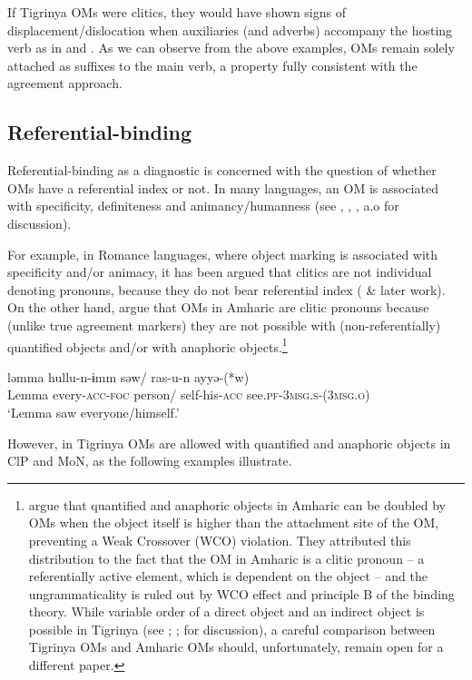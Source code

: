 \documentclass[output=paper]{langscibook}
\begin{document}
\noindent If Tigrinya OMs were clitics, they would have shown signs of displacement\slash dislocation when auxiliaries (and adverbs) accompany the hosting verb as in  and . As we can observe from the above examples, OMs remain solely attached as suffixes to the main verb, a property fully consistent with the agreement approach.


\subsection{Referential-binding}

Referential-binding as a diagnostic is concerned with the question of whether OMs have a referential index or not. In many languages, an OM is associated with specificity, definiteness and animancy/humanness (see \citealt{aissen03}, \citealt{danon2006}, \citealt{kalin16}, a.o for discussion). 

For example, in Romance languages, where object marking is associated with specificity and/or animacy, it has been argued that clitics are not individual denoting pronouns, because they do not bear referential index (\citealt{sport96} \& later work). On the other hand, \citet{bakerandkramer18} argue that OMs in Amharic are clitic pronouns because (unlike true agreement markers) they are not possible with (non-referentially) quantified objects and/or with anaphoric objects.\footnote{\citet{bakerandkramer18} argue that quantified and anaphoric objects in Amharic can be doubled by OMs when the object itself is higher than the attachment site of the OM, preventing a Weak Crossover (WCO) violation. They attributed this distribution to the fact that the OM in Amharic is a clitic pronoun -- a referentially active element, which is dependent on the object -- and the ungrammaticality is ruled out by WCO effect and principle B of the binding theory. While variable order of a direct object and an indirect object is possible in Tigrinya (see \citealt{mason96}; \citealt{kifle07}; for discussion), a careful comparison between Tigrinya OMs and Amharic OMs should, unfortunately, remain open for a different paper.}


\ea\label{ex:Gebregziabher:amharic}
\gll ləmma hullu-n-ɨmm səw/ ras-u-n ayyə-(*w) \\ 
Lemma every-{\scshape acc-foc} person/ self-his-{\scshape acc} see.{\scshape pf-3msg.s-(3msg.o}) \\
\glt `Lemma saw everyone/himself.'
\z

\noindent However, in Tigrinya OMs are allowed with quantified and anaphoric objects in ClP and MoN, as the following examples illustrate.
\end{document}
